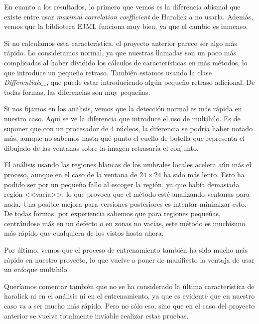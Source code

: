 En cuanto a los resultados, lo primero que vemos es la diferencia abismal que existe entre usar \textit{maximal correlation coefficient} de Haralick a no usarla. Además, vemos que la biblioteca EJML funciona muy bien, ya que el cambio es inmenso.

Si no calculamos esta característica, el proyecto anterior parece ser algo más rápido. Lo consideramos normal, ya que nuestras llamadas son un poco más complicadas al haber dividido los cálculos de características en más métodos, lo que introduce un pequeño retraso. También estamos usando la clase \textit{Differentials\_}, que puede estar introduciendo algún pequeño retraso adicional. De todas formas, las diferencias son muy pequeñas.

Si nos fijamos en los análisis, vemos que la detección normal es más rápida en nuestro caso. Aquí se ve la diferencia que introduce el uso de multihilo. Es de suponer que con un procesador de 4 núcleos, la diferencia se podría haber notado más, aunque no sabemos hasta qué punto el cuello de botella que representa el dibujado de las ventanas sobre la imagen retrasaría el conjunto.

El análisis usando las regiones blancas de los umbrales locales acelera aún más el proceso, aunque en el caso de la ventana de $24\times24$ ha sido más lento. Esto ha podido ser por un pequeño fallo al escoger la región, ya que había demasiada región <<vacía>>, lo que provoca que el método esté analizando ventanas para nada. Una posible mejora para versiones posteriores es intentar minimizar esto. De todas formas, por experiencia sabemos que para regiones pequeñas, centrándose más en un defecto o en zonas no vacías, este método es muchísimo más rápido que cualquiera de los vistos hasta ahora.

Por último, vemos que el proceso de entrenamiento también ha sido mucho más rápido en nuestro proyecto, lo que vuelve a poner de manifiesto la ventaja de usar un enfoque multihilo.

Queríamos comentar también que no se ha considerado la última característica de haralick ni en el análisis ni en el entrenamiento, ya que es evidente que en nuestro caso va a ser mucho más rápido. Pero no sólo eso, sino que en el caso del proyecto anterior se vuelve totalmente inviable realizar estas pruebas. 

